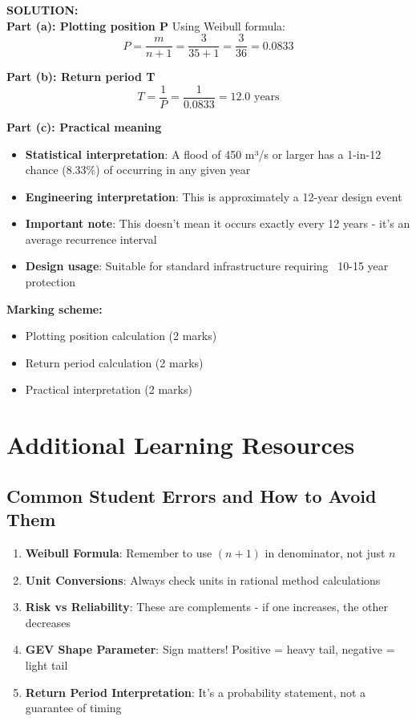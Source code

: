 \documentclass[11pt,a4paper]{article}
\newenvironment{solutionbox}
    {\color{solution}\begin{framed}\textbf{SOLUTION:}\\\vspace{0.2cm}}
    {\end{framed}}
\begin{document}
\begin{enumerate}
\begin{solutionbox}
\textbf{Part (a): Plotting position P}
Using Weibull formula:
$$P = \frac{m}{n+1} = \frac{3}{35+1} = \frac{3}{36} = 0.0833$$

\textbf{Part (b): Return period T}
$$T = \frac{1}{P} = \frac{1}{0.0833} = 12.0 \text{ years}$$

\textbf{Part (c): Practical meaning}
\begin{itemize}[nosep]
    \item \textbf{Statistical interpretation}: A flood of 450 m³/s or larger has a 1-in-12 chance (8.33\%) of occurring in any given year
    \item \textbf{Engineering interpretation}: This is approximately a 12-year design event
    \item \textbf{Important note}: This doesn't mean it occurs exactly every 12 years - it's an average recurrence interval
    \item \textbf{Design usage}: Suitable for standard infrastructure requiring ~10-15 year protection
\end{itemize}

\textbf{Marking scheme:}
\begin{itemize}[nosep]
    \item Plotting position calculation (2 marks)
    \item Return period calculation (2 marks)
    \item Practical interpretation (2 marks)
\end{itemize}
\end{solutionbox}

\end{enumerate}

\newpage

\section*{Additional Learning Resources}

\subsection*{Common Student Errors and How to Avoid Them}

\begin{enumerate}
\item \textbf{Weibull Formula}: Remember to use $(n+1)$ in denominator, not just $n$
\item \textbf{Unit Conversions}: Always check units in rational method calculations
\item \textbf{Risk vs Reliability}: These are complements - if one increases, the other decreases
\item \textbf{GEV Shape Parameter}: Sign matters! Positive = heavy tail, negative = light tail
\item \textbf{Return Period Interpretation}: It's a probability statement, not a guarantee of timing
\end{enumerate}
\end{document}
